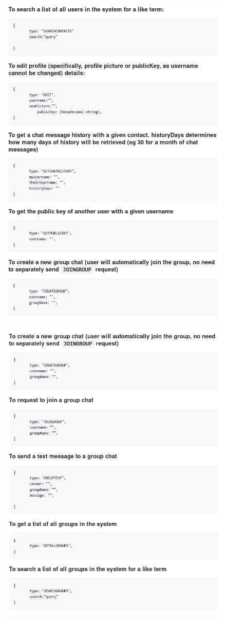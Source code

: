\begin{figure}[H]
  \includegraphics[width=\linewidth]{appendices/request2.png}
\end{figure}
\begin{figure}[H]
  \includegraphics[width=\linewidth]{appendices/request3.png}
\end{figure}